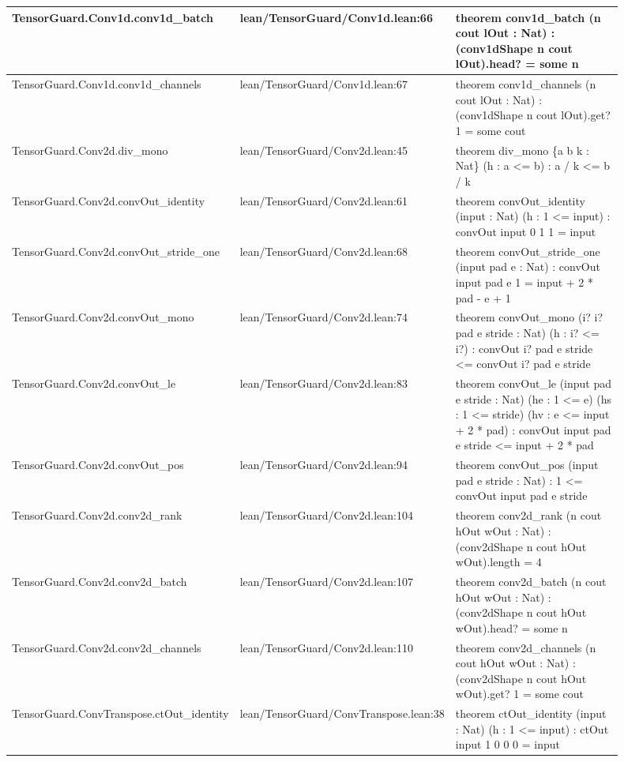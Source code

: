 \documentclass[10pt]{article}
\begin{document}
\begin{longtable}{|p{0.30\linewidth}|p{0.13\linewidth}|p{0.47\linewidth}|}
\hline
TensorGuard.Conv1d.conv1d\_batch & lean/TensorGuard/Conv1d.lean:66 & theorem conv1d\_batch (n cout lOut : Nat) : (conv1dShape n cout lOut).head? = some n \\
\hline
TensorGuard.Conv1d.conv1d\_channels & lean/TensorGuard/Conv1d.lean:67 & theorem conv1d\_channels (n cout lOut : Nat) : (conv1dShape n cout lOut).get? 1 = some cout \\
\hline
TensorGuard.Conv2d.div\_mono & lean/TensorGuard/Conv2d.lean:45 & theorem div\_mono \{a b k : Nat\} (h : a <= b) : a / k <= b / k \\
\hline
TensorGuard.Conv2d.convOut\_identity & lean/TensorGuard/Conv2d.lean:61 & theorem convOut\_identity (input : Nat) (h : 1 <= input) : convOut input 0 1 1 = input \\
\hline
TensorGuard.Conv2d.convOut\_stride\_one & lean/TensorGuard/Conv2d.lean:68 & theorem convOut\_stride\_one (input pad e : Nat) : convOut input pad e 1 = input + 2 * pad - e + 1 \\
\hline
TensorGuard.Conv2d.convOut\_mono & lean/TensorGuard/Conv2d.lean:74 & theorem convOut\_mono (i? i? pad e stride : Nat) (h : i? <= i?) : convOut i? pad e stride <= convOut i? pad e stride \\
\hline
TensorGuard.Conv2d.convOut\_le & lean/TensorGuard/Conv2d.lean:83 & theorem convOut\_le (input pad e stride : Nat) (he : 1 <= e) (hs : 1 <= stride) (hv : e <= input + 2 * pad) : convOut input pad e stride <= input + 2 * pad \\
\hline
TensorGuard.Conv2d.convOut\_pos & lean/TensorGuard/Conv2d.lean:94 & theorem convOut\_pos (input pad e stride : Nat) : 1 <= convOut input pad e stride \\
\hline
TensorGuard.Conv2d.conv2d\_rank & lean/TensorGuard/Conv2d.lean:104 & theorem conv2d\_rank (n cout hOut wOut : Nat) : (conv2dShape n cout hOut wOut).length = 4 \\
\hline
TensorGuard.Conv2d.conv2d\_batch & lean/TensorGuard/Conv2d.lean:107 & theorem conv2d\_batch (n cout hOut wOut : Nat) : (conv2dShape n cout hOut wOut).head? = some n \\
\hline
TensorGuard.Conv2d.conv2d\_channels & lean/TensorGuard/Conv2d.lean:110 & theorem conv2d\_channels (n cout hOut wOut : Nat) : (conv2dShape n cout hOut wOut).get? 1 = some cout \\
\hline
TensorGuard.ConvTranspose.ctOut\_identity & lean/TensorGuard/ConvTranspose.lean:38 & theorem ctOut\_identity (input : Nat) (h : 1 <= input) : ctOut input 1 0 0 0 = input \\

\end{longtable}
\end{document}

